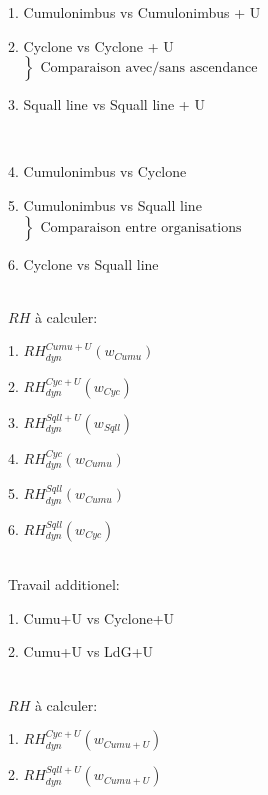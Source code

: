 \documentclass{article}
\begin{document}
\begin{list}{}{}
    \item 1. Cumulonimbus vs Cumulonimbus + U 
    \item 2. Cyclone vs Cyclone + U ~~~~~~~~~~~~~~~~~~~~~~~~~~~~~~~~~~~\hbox{
        $\left.\begin{array}{lcl}
            ~ \\
            ~\\
            ~ \\
          \end{array}\right\}\begin{array}{lcl}
           \text{Comparaison avec/sans ascendance}
         \end{array}$}
    \item 3. Squall line vs Squall line + U
    \item ~\\
    \item 4. Cumulonimbus vs Cyclone
    \item 5. Cumulonimbus vs Squall line     ~~~~~~~~~~~~~~~~~~~~~~~~~~~~~~\hbox{
        $\left.\begin{array}{lcl}
            ~ \\
            ~\\
            ~ \\
          \end{array}\right\}\begin{array}{lcl}
           \text{Comparaison entre organisations}
         \end{array}$}
    \item 6. Cyclone vs Squall line
\end{list}
~\\
$RH$ à calculer:
\begin{list}{}{}
    \item 1. $RH_{dyn}^{Cumu+U}(w_{Cumu})$
    \item 2. $RH_{dyn}^{Cyc+U}(w_{Cyc})$
    \item 3. $RH_{dyn}^{Sqll+U}(w_{Sqll})$
    \item 4. $RH_{dyn}^{Cyc}(w_{Cumu})$
    \item 5. $RH_{dyn}^{Sqll}(w_{Cumu})$
    \item 6. $RH_{dyn}^{Sqll}(w_{Cyc})$
\end{list}
~\\
Travail additionel: 
\begin{list}{}{}
    \item 1. Cumu+U vs Cyclone+U
    \item 2. Cumu+U vs LdG+U
\end{list}
~\\
$RH$ à calculer:
\begin{list}{}{}
    \item 1. $RH_{dyn}^{Cyc+U}(w_{Cumu+U})$
    \item 2. $RH_{dyn}^{Sqll+U}(w_{Cumu+U})$
\end{list}
\end{document}
